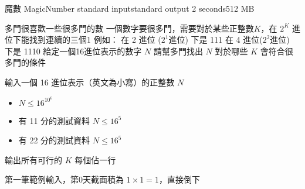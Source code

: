 \gdef\thisproblemauthor{}
\gdef\thisproblemdeveloper{}
\gdef\thisproblemorigin{}
\begin{problem}{魔數 MagicNumber}
{standard input}{standard output}
{2 seconds}{512 MB}{}

多門很喜歡一些很多門的數\newline
一個數字要很多門，需要對於某些正整數$K$，在 $2^K$ 進位下能找到連續的三個1\newline
\newline
例如： 在 2 進位 ($2^1$進位) 下是 111 在 4 進位($2^2$進位) 下是 1110\newline
\newline
給定一個16進位表示的數字 $N$\newline
請幫多門找出 $N$ 對於哪些 $K$ 會符合很多門的條件\newline

\InputFile

輸入一個 16 進位表示（英文為小寫）的正整數 $N$
\begin{iofmt}
\begin{itemize}
	\item $N \leq 16^{10^6}$
	\item 有 11 分的測試資料 $N \leq 16^5$
	\item 有 22 分的測試資料 $N \leq 16^5$
\end{itemize}
\end{iofmt}

\OutputFile

輸出所有可行的 $K$ \newline
每個佔一行

\Examples

\begin{example}
%
%
%
\end{example}

第一筆範例輸入，第0天截面積為 $1 \times 1 = 1$，直接倒下

\end{problem}
